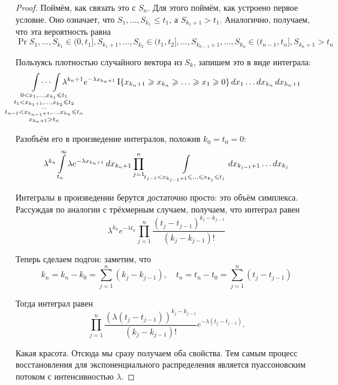 \begin{proof}
	Поймём, как связать это с \(S_{n}\). Для этого поймём, как устроено первое 
	условие. Оно означает, что \(S_{1}, \dots, S_{k_{1}} \leq t_{1}\), а 
	\(S_{k_{1} + 1} > t_{1}\). Аналогично, получаем, что эта вероятность равна
	\[
	\Pr{S_{1}, \dots, S_{k_{1}} \in (0, t_{1}], S_{k_{1} + 1}, \dots, 
		S_{k_{2}} \in (t_{1}, t_{2}], \ldots, S_{k_{n - 1} + 1}, \dots, 
		S_{k_{n}} \in (t_{n - 1}, t_{n}], S_{k_{n} + 1} > t_{n}}
	\]
	
	Пользуясь плотностью случайного вектора из \(S_{k}\), запишем это в виде 
	интеграла:
	\[
	\idotsint\limits_{\mathclap{\substack{0 < x_{1}, \ldots, x_{k_{1}} \leq 
				t_{1} \\ t_{1} < x_{k_{1} + 1}, \ldots, x_{k_{2}} \leq t_{2} \\ 
				\dots 
				\\ t_{n - 1} < x_{k_{n - 1} + 1}, \ldots, x_{k_{n}} \leq t_{n} 
				\\ 
				x_{k_{n} + 1} > t_{n}}}} \lambda^{k_{n} + 1}e^{-\lambda 
				x_{k_{n} + 
			1}}\I\{x_{k_{n} + 1} \geq x_{k_{n}} \geq \ldots \geq x_{1} \geq 
	0\}\diff x_{1} \ldots \diff x_{k_{n}} \diff x_{k_{n} + 1}
	\]
	
	Разобъём его в произведение интегралов, положив \(k_{0} = t_{0} = 0\):
	\[
	\lambda^{k_{n}}\int\limits_{t_{n}}^{\infty} \lambda e^{-\lambda 
		x_{k_{n} + 1}}\mathop{}\!d x_{k_{n} + 1}\prod_{j = 1}^{n} 
	\int\limits_{\substack{t_{j - 1} < x_{k_{j - 1} + 
				1} \leqslant \ldots \leqslant x_{k_{j}} \leqslant t_{j}}} \mathop{}\!d x_{k_{j - 1} + 
				1} 
	\ldots \mathop{}\!d x_{k_{j}}
	\]
	
	Интегралы в произведении берутся достаточно просто: это объём симплекса. 
	Рассуждая по аналогии с трёхмерным случаем, получаем, что интеграл равен
	\[
	\lambda^{k_{n}}e^{-\lambda t_{n}}\prod_{j = 1}^{n} \frac{(t_{j} - t_{j 
			- 1})^{k_{j} - k_{j - 1}}}{(k_{j} - k_{j - 1})!}
	\]
	
	Теперь сделаем подгон: заметим, что
	\[
	k_{n} = k_{n} - k_{0} = \sum_{j = 1}^{n} (k_{j} - k_{j - 1}), \quad 
	t_{n} = t_{n} - t_{0} = \sum_{j = 1}^{n} (t_{j} - t_{j - 1})
	\]
	
	Тогда интеграл равен
	\[
	\prod_{j = 1}^{n} \frac{(\lambda(t_{j} - t_{j - 1}))^{k_{j} - 
			k_{j - 1}}}{(k_{j} - k_{j - 1})!}e^{-\lambda(t_{j} - t_{j - 1})}.
	\]
	
	Какая красота. Отсюда мы сразу получаем оба свойства. Тем самым процесс 
	восстановления для экспоненциального распределения является пуассоновским 
	потоком с интенсивностью \(\lambda\).
\end{proof}


